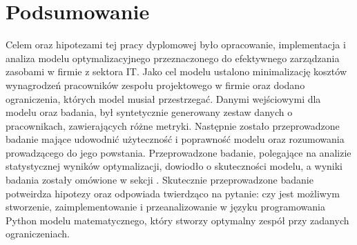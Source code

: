 \chapter*{Podsumowanie}
\par Celem oraz hipotezami tej pracy dyplomowej było opracowanie, implementacja i analiza modelu optymalizacyjnego przeznaczonego do efektywnego zarządzania zasobami w firmie z sektora IT. Jako cel modelu ustalono minimalizację kosztów wynagrodzeń pracowników zespołu projektowego w firmie oraz dodano ograniczenia, których model musiał przestrzegać. Danymi wejściowymi dla modelu oraz badania, był syntetycznie generowany zestaw danych o pracownikach, zawierających różne metryki. Następnie zostało przeprowadzone badanie mające udowodnić użyteczność i poprawność modelu oraz rozumowania prowadzącego do jego powstania. Przeprowadzone badanie, polegające na analizie statystycznej wyników optymalizacji, dowiodło o skuteczności modelu, a wyniki badania zostały omówione w sekcji . Skutecznie przeprowadzone badanie potweirdza hipotezy oraz odpowiada twierdząco na pytanie: czy jest możliwym stworzenie, zaimplementowanie i przeanalizowanie w języku programowania Python modelu matematycznego, który stworzy optymalny zespół przy zadanych ograniczeniach.


